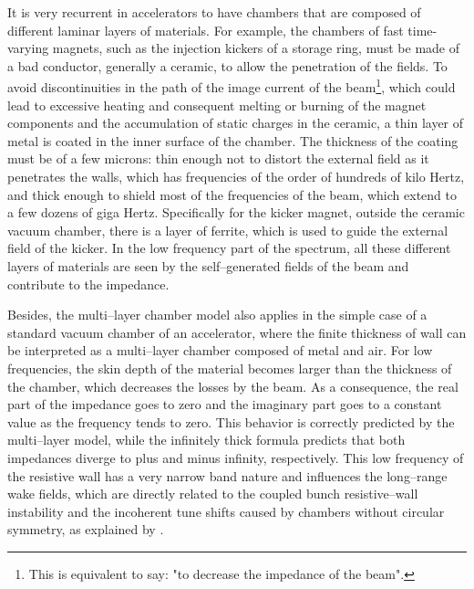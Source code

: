     It is very recurrent in accelerators to have chambers that are composed of different laminar layers of materials. For example, the chambers of fast time-varying magnets, such as the injection kickers of a storage ring, must be made of a bad conductor, generally a ceramic, to allow the penetration of the fields. To avoid discontinuities in the path of the image current of the beam\footnote{This is equivalent to say: "to decrease the impedance of the beam".}, which could lead to excessive heating and consequent melting or burning of the magnet components and the accumulation of static charges in the ceramic, a thin layer of metal is coated in the inner surface of the chamber. The thickness of the coating must be of a few microns: thin enough not to distort the external field as it penetrates the walls, which has frequencies of the order of hundreds of kilo Hertz, and thick enough to shield most of the frequencies of the beam, which extend to a few dozens of giga Hertz. Specifically for the kicker magnet, outside the ceramic vacuum chamber, there is a layer of ferrite, which is used to guide the external field of the kicker. In the low frequency part of the spectrum, all these different layers of materials are seen by the self--generated fields of the beam and contribute to the impedance.

    Besides, the multi--layer chamber model also applies in the simple case of a standard vacuum chamber of an accelerator, where the finite thickness of wall can be interpreted as a multi--layer chamber composed of metal and air. For low frequencies, the skin depth of the material becomes larger than the thickness of the chamber, which decreases the losses by the beam. As a consequence, the real part of the impedance goes to zero and the imaginary part goes to a constant value as the frequency tends to zero. This behavior is correctly predicted by the multi--layer model, while the infinitely thick formula predicts that both impedances diverge to plus and minus infinity, respectively. This low frequency of the resistive wall has a very narrow band nature and influences the long--range wake fields, which are directly related to the coupled bunch resistive--wall instability and the incoherent tune shifts caused by chambers without circular symmetry, as explained by .

